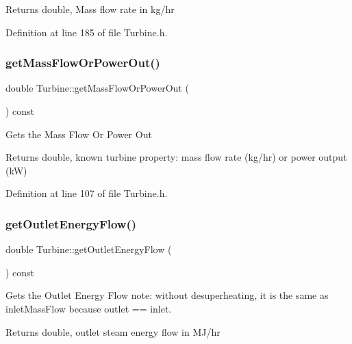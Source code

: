 \begin{DoxyReturn}{Returns}
double, Mass flow rate in kg/hr 
\end{DoxyReturn}


Definition at line 185 of file Turbine.\+h.

\mbox{\label{class_turbine_a820a090d264b96ee84f717555545c287}} 
\subsubsection{\texorpdfstring{get\+Mass\+Flow\+Or\+Power\+Out()}{getMassFlowOrPowerOut()}}
{\footnotesize\ttfamily double Turbine\+::get\+Mass\+Flow\+Or\+Power\+Out (\begin{DoxyParamCaption}{ }\end{DoxyParamCaption}) const\hspace{0.3cm}{\ttfamily [inline]}}

Gets the Mass Flow Or Power Out

\begin{DoxyReturn}{Returns}
double, known turbine property\+: mass flow rate (kg/hr) or power output (kW) 
\end{DoxyReturn}


Definition at line 107 of file Turbine.\+h.

\mbox{\label{class_turbine_aa20c0f9dd81cd9bfd5eda77f588516b5}} 
\subsubsection{\texorpdfstring{get\+Outlet\+Energy\+Flow()}{getOutletEnergyFlow()}}
{\footnotesize\ttfamily double Turbine\+::get\+Outlet\+Energy\+Flow (\begin{DoxyParamCaption}{ }\end{DoxyParamCaption}) const\hspace{0.3cm}{\ttfamily [inline]}}

Gets the Outlet Energy Flow note\+: without desuperheating, it is the same as inlet\+Mass\+Flow because outlet == inlet. \begin{DoxyReturn}{Returns}
double, outlet steam energy flow in M\+J/hr 
\end{DoxyReturn}


